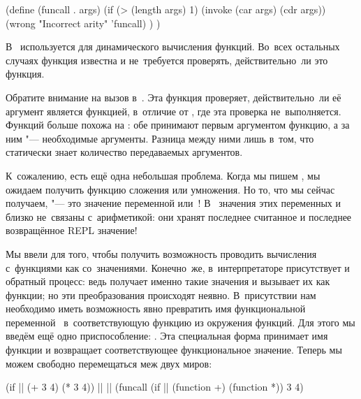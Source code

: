 \begin{code:lisp}
(define (funcall . args)
  (if (> (length args) 1)
      (invoke (car args) (cdr args))
      (wrong "Incorrect arity" 'funcall) ) )
\end{code:lisp}

В~  используется для динамического вычисления функций. Во~всех
остальных случаях функция известна и не~требуется проверять, действительно~ли
это функция.

Обратите внимание на вызов  в~. Эта функция проверяет,
действительно~ли её аргумент является функцией, в~отличие от
, где эта проверка не~выполняется. Функций 
больше похожа на : обе принимают первым аргументом функцию, а за ним
"--- необходимые аргументы. Разница между ними лишь в~том, что 
статически знает количество передаваемых аргументов.

К~сожалению, есть ещё одна небольшая проблема. Когда мы пишем , мы ожидаем получить функцию сложения или умножения. Но то,
что мы сейчас получаем, "--- это значение переменной \ic{+} или~\ic{*}!
В~{\CommonLisp} значения этих переменных и близко не~связаны с~арифметикой: они
хранят последнее считанное и последнее возвращённое REPL значение!

Мы ввели  для того, чтобы получить возможность проводить вычисления
с~функциями как со~значениями. Конечно~же, в~интерпретаторе присутствует и
обратный процесс: ведь  получает именно такие значения
и вызывает их как функции; но эти преобразования происходят неявно.
В~присутствии  нам необходимо иметь возможность явно превратить имя
функциональной переменной~\ic{+} в~соответствующую функцию из окружения функций.
Для этого мы введём ещё одно приспособление: . Эта специальная
форма принимает имя функции и возвращает соответствующее функциональное
значение. Теперь мы можем свободно перемещаться меж двух миров:

\begin{code:lisp}
(if || (+ 3 4) (* 3 4)) |\equals|
       |\equals| (funcall (if || (function +) (function *)) 3 4)
\end{code:lisp}

